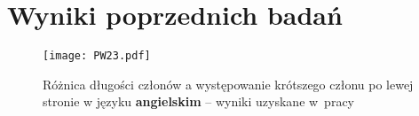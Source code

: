\chapter{Wyniki poprzednich badań} \label{dod:PW23}

\graphicspath{{results}}
\begin{sidewaysfigure}
\centering
\texttt{[image: PW23.pdf]}
\caption{Różnica długości członów a występowanie krótszego członu po lewej stronie w języku \textbf{angielskim} --
wyniki uzyskane w~pracy \cite{przepiorkowski2023conjunct}}
\label{fig:PW23}
\end{sidewaysfigure}